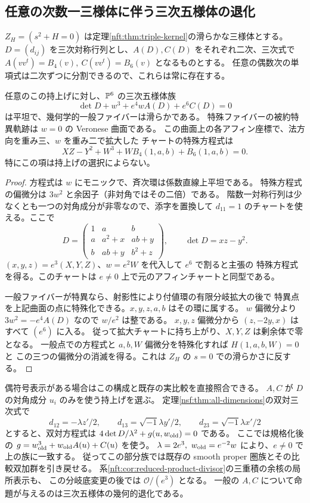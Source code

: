 \subsection{任意の次数一三様体に伴う三次五様体の退化}
\label{vcd:sec:degeneration}
$Z_H=(s^2+H=0)$ は定理\ref{nft:thm:triple-kernel}の滑らかな三様体とする。
$D=(d_{ij})$ を三次対称行列とし、$A(D),C(D)$ をそれぞれ二次、三次式で
$A(vv^t)=B_4(v),\ C(vv^t)=B_6(v)$ となるものとする。
任意の偶数次の単項式は二次ずつに分割できるので、これらは常に存在する。
\begin{proposition}\label{vcd:prop:cubic-arc}
任意のこの持上げに対し、$\mathbb P^6$ の三次五様体族
\[
 \det D+w^3+e^4 w A(D)+e^6 C(D)=0
\]
は平坦で、幾何学的一般ファイバーは滑らかである。
特殊ファイバーの被約特異軌跡は $w=0$ の Veronese 曲面である。
この曲面上の各アフィン座標で、法方向を重み三、$w$ を重み二で拡大した
チャートの特殊方程式は
\[
             XZ-Y^2+W^3+WB_4(1,a,b)+B_6(1,a,b)=0 .
\]
特にこの項は持上げの選択によらない。
\end{proposition}
\begin{proof}
方程式は $w$ にモニックで、斉次環は係数直線上平坦である。
特殊方程式の偏微分は $3w^2$ と余因子（非対角ではその二倍）である。
階数一対称行列は少なくとも一つの対角成分が非零なので、添字を置換して
$d_{11}=1$ のチャートを使える。ここで
\[
 D=\begin{pmatrix}1&a&b\\a&a^2+x&ab+y\\b&ab+y&b^2+z\end{pmatrix},
 \qquad \det D=xz-y^2 .
\]
$(x,y,z)=e^3(X,Y,Z)$、$w=e^2W$ を代入して $e^6$ で割ると主張の
特殊方程式を得る。このチャートは $e\ne0$ 上で元のアフィンチャートと同型である。

一般ファイバーが特異なら、射影性により付値環の有限分岐拡大の後で
特異点を上記曲面の点に特殊化できる。$x,y,z,a,b$ はその環に属する。
$w$ 偏微分より $3w^2=-e^4 A(D)$ なので $w/e^2$ は整である。
$x,y,z$ 偏微分から $(z,-2y,x)$ はすべて $(e^6)$ に入る。
従って拡大チャートに持ち上がり、$X,Y,Z$ は剰余体で零となる。
一般点での方程式と $a,b,W$ 偏微分を特殊化すれば $H(1,a,b,W)=0$ と
この三つの偏微分の消滅を得る。これは $Z_H$ の $s=0$ での滑らかさに反する。
\end{proof}

偶符号表示がある場合はこの構成と既存の実比較を直接照合できる。
$A,C$ が $D$ の対角成分 $u_i$ のみを使う持上げを選ぶ。
定理\ref{nsf:thm:all-dimensions}の双対三次式で
\[
 d_{12}=-\lambda z'/2,\qquad d_{13}=\sqrt{-1}\lambda y'/2,\qquad
 d_{23}=\sqrt{-1}\lambda x'/2
\]
とすると、双対方程式は $4\det D/\lambda^2+g(u,w_{\rm old})=0$ である。
ここでは規格化後の $g=w_{\rm old}^3+w_{\rm old}A(u)+C(u)$ を使う。
$\lambda=2e^3,\ w_{\rm old}=e^{-2}w$ により、$e\ne0$ で上の族に一致する。
従ってこの部分族では既存の smooth proper 圏族とその比較双加群を引き戻せる。
系\ref{nft:cor:reduced-product-divisor}の三重積の余核の局所表示も、
この分岐底変更の後では $\mathcal O/(e^3)$ となる。
一般の $A,C$ について命題が与えるのは三次五様体の幾何的退化である。

